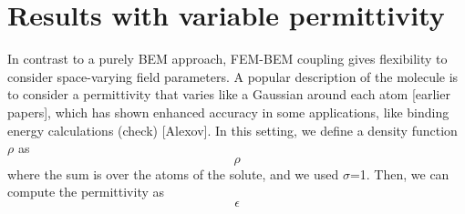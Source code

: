 
\section*{\sffamily \Large Results with variable permittivity}

In contrast to a purely BEM approach, FEM-BEM coupling gives flexibility to consider space-varying field parameters. 
A popular description of the molecule is to consider a permittivity that varies like a Gaussian around each atom [earlier papers], which has shown enhanced accuracy in some applications, like binding energy calculations (check) [Alexov].
In this setting, we define a density function $\rho$ as
%
\begin{equation}
\rho
\end{equation}
%
where the sum is over the atoms of the solute, and we used $\sigma$=1. Then, we can compute the permittivity as
%
\begin{equation}
\epsilon
\end{equation}
%

